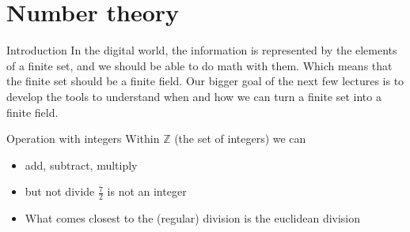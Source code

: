     \section{Number theory}
    \begin{parag}{Introduction}
        In the digital world, the information is represented by the elements of a finite set, and we should be able to do math with them. Which means that the finite set should be a finite field. Our bigger goal of the next few lectures is to develop the tools to understand when and how we can turn a finite set into a finite field.
    \end{parag}
    
    \begin{parag}{Operation with integers}
        Within $ \mathbb{Z}$ (the set of integers) we can
        \begin{itemize}
            \item add, subtract, multiply
            \item but not divide $ \frac{7}{2}$ is not an integer
            \item What comes closest to the (regular) division is the euclidean division
        \end{itemize}
    \end{parag}
    
